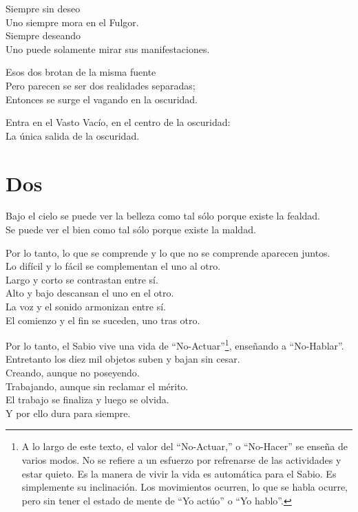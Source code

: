\documentclass[hidelinks]{memoir}
\begin{document}
	Siempre sin deseo\\
	Uno siempre mora en el Fulgor.\\
	Siempre deseando\\
	Uno puede solamente mirar sus manifestaciones.
	
	Esos dos brotan de la misma fuente\\
	Pero parecen se ser dos realidades separadas;\\
	Entonces se surge el vagando en la oscuridad.
	
	Entra en el Vasto Vacío, en el centro de la oscuridad:\\
	La única salida de la oscuridad.
	
	\chapter*{Dos}
	
	Bajo el cielo se puede ver la belleza como tal sólo porque existe la
	fealdad.\\
	Se puede ver el bien como tal sólo porque existe la maldad.
	
	Por lo tanto, lo que se comprende y lo que no se comprende aparecen
	juntos.\\
	Lo difícil y lo fácil se complementan el uno al otro.\\
	Largo y corto se contrastan entre sí.\\
	Alto y bajo descansan el uno en el otro.\\
	La voz y el sonido armonizan entre sí.\\
	El comienzo y el fin se suceden, uno tras otro.
	
	Por lo tanto, el Sabio vive una vida de ``No-Actuar''\footnote{A lo largo de este texto, el valor del ``No-Actuar,'' o ``No-Hacer'' se
		enseña de varios modos. No se refiere a un esfuerzo por refrenarse de
		las actividades y estar quieto. Es la manera de vivir la vida es
		automática para el Sabio. Es simplemente su inclinación. Los movimientos
		ocurren, lo que se habla ocurre, pero sin tener el estado de mente de
		``Yo actúo'' o ``Yo hablo''.}, enseñando a
	``No-Hablar''.\\
	Entretanto los diez mil objetos suben y bajan sin cesar.\\
	Creando, aunque no poseyendo.\\
	Trabajando, aunque sin reclamar el mérito.\\
	El trabajo se finaliza y luego se olvida.\\
	Y por ello dura para siempre.
	
\end{document}
